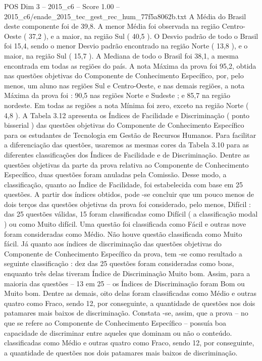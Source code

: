 \begin{textsample}{POS Dim 3 – 2015\_c6 – Score 1.00 – 2015\_c6/enade\_2015\_tec\_gest\_rec\_hum\_77f5a8062b.txt}
A Média do Brasil deste componente foi de 39,8.
A menor Média foi observada na região Centro-Oeste ( 37,2 ), e a maior, na região Sul ( 40,5 ).
O Desvio padrão de todo o Brasil foi 15,4, sendo o menor Desvio padrão encontrado na região Norte ( 13,8 ), e o maior, na região Sul ( 15,7 ).
A Mediana de todo o Brasil foi 38,1, a mesma encontrada em todas as regiões do país.
A nota Máxima da prova foi 95,2, obtida nas questões objetivas do Componente de Conhecimento Específico, por, pelo menos, um aluno nas regiões Sul e Centro-Oeste, e nas demais regiões, a nota Máxima da prova foi : 90,5 nas regiões Norte e Sudeste ; e 85,7 na região nordeste.
Em todas as regiões a nota Mínima foi zero, exceto na região Norte ( 4,8 ).
A Tabela 3.12 apresenta os Índices de Facilidade e Discriminação ( ponto bisserial ) das questões objetivas do Componente de Conhecimento Específico para os estudantes de Tecnologia em Gestão de Recursos Humanos.
Para facilitar a diferenciação das questões, usaremos as mesmas cores da Tabela 3.10 para as diferentes classificações dos Índices de Facilidade e de Discriminação.
Dentre as questões objetivas da parte da prova relativa ao Componente de Conhecimento Específico, duas questões foram anuladas pela Comissão.
Desse modo, a classificação, quanto ao Índice de Facilidade, foi estabelecida com base em 25 questões.
A partir dos índices obtidos, pode -se concluir que um pouco menos de dois terços das questões objetivas da prova foi considerado, pelo menos, Difícil : das 25 questões válidas, 15 foram classificadas como Difícil ( a classificação modal ) ou como Muito difícil.
Uma questão foi classificada como Fácil e outras nove foram consideradas como Médio.
Não houve questão classificada como Muito fácil.
Já quanto aos índices de discriminação das questões objetivas do Componente de Conhecimento Específico da prova, tem -se como resultado a seguinte classificação : dez das 25 questões foram consideradas como boas, enquanto três delas tiveram Índice de Discriminação Muito bom.
Assim, para a maioria das questões – 13 em 25 – os Índices de Discriminação foram Bom ou Muito bom.
Dentre as demais, oito delas foram classificadas como Médio e outras quatro como Fraco, sendo 12, por conseguinte, a quantidade de questões nos dois patamares mais baixos de discriminação.
Constata -se, assim, que a prova – no que se refere ao Componente de Conhecimento Específico – possuía boa capacidade de discriminar entre aqueles que dominam ou não o conteúdo. classificadas como Médio e outras quatro como Fraco, sendo 12, por conseguinte, a quantidade de questões nos dois patamares mais baixos de discriminação.

\end{textsample}
